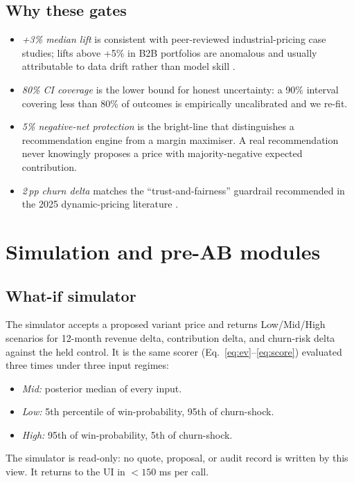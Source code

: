 \documentclass[11pt,a4paper]{article}
\begin{document}
\subsection{Why these gates}
\begin{itemize}[leftmargin=2em,itemsep=2pt]
  \item \emph{+3\% median lift} is consistent with peer-reviewed industrial-pricing case studies; lifts above +5\% in B2B portfolios are anomalous and usually attributable to data drift rather than model skill \cite{omnibound2026b2b}.
  \item \emph{80\% CI coverage} is the lower bound for honest uncertainty: a 90\% interval covering less than 80\% of outcomes is empirically uncalibrated and we re-fit.
  \item \emph{5\% negative-net protection} is the bright-line that distinguishes a recommendation engine from a margin maximiser. A real recommendation never knowingly proposes a price with majority-negative expected contribution.
  \item \emph{2\,pp churn delta} matches the ``trust-and-fairness'' guardrail recommended in the 2025 dynamic-pricing literature \cite{influencers2025dynamic}.
\end{itemize}

\section{Simulation and pre-AB modules}

\subsection{What-if simulator}
The simulator accepts a proposed variant price and returns Low/Mid/High scenarios for 12-month revenue delta, contribution delta, and churn-risk delta against the held control. It is the same scorer (Eq.~\ref{eq:ev}--\ref{eq:score}) evaluated three times under three input regimes:
\begin{itemize}[leftmargin=2em,itemsep=2pt]
  \item \textit{Mid:} posterior median of every input.
  \item \textit{Low:} 5th percentile of win-probability, 95th of churn-shock.
  \item \textit{High:} 95th of win-probability, 5th of churn-shock.
\end{itemize}
The simulator is read-only: no quote, proposal, or audit record is written by this view. It returns to the UI in $<150$ ms per call.
\end{document}
